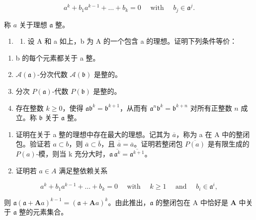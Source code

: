\[
a ^ {k} + b _ {1} a ^ {k - 1} + \dots + b _ {k} = 0 \quad \text { with } \quad b _ {j} \in \mathfrak {a} ^ {j}.
\]

称 \(a\) 关于理想 \(\mathfrak{a}\) 整。

\begin{enumerate}
\def\labelenumi{\arabic{enumi})}
\setcounter{enumi}{8}
\tightlist
\item
  \begin{enumerate}
  \def\labelenumii{\alph{enumii})}
  \tightlist
  \item
    设 A 和 a 如上，b 为 A 的一个包含 a 的理想。证明下列条件等价：
  \end{enumerate}
\end{enumerate}

\begin{enumerate}
\def\labelenumi{(\roman{enumi})}
\item
  b 的每个元素都关于 a 整。
\item
  \(\mathcal{A}(\mathfrak{a})\)-分次代数 \(\mathcal{A}(\mathfrak{b})\) 是整的。
\item
  分次 \(P(\mathfrak{a})\)-代数 \(P(\mathfrak{b})\) 是整的。
\item
  存在整数 \(k \geqslant 0\)，使得 \(\mathfrak{a}\mathfrak{b}^{k} = \mathfrak{b}^{k+1}\)，从而有 \(\mathfrak{a}^{n}\mathfrak{b}^{k} = \mathfrak{b}^{k+n}\) 对所有正整数 \(n\) 成立。称 \(\mathfrak{b}\) 关于 \(\mathfrak{a}\) 整。
\end{enumerate}

\begin{enumerate}
\def\labelenumi{\alph{enumi})}
\setcounter{enumi}{1}
\item
  证明在关于 a 整的理想中存在最大的理想。记其为 \(\overline{a}\)，称为 a 在 A 中的整闭包。验证若 \(a \subset b\)，则 \(\overline{a} \subset \overline{b}\)，且 \(\overline{\overline{a}} = \overline{a}\)。证明若整闭包 \(\overline{P(a)}\) 是有限生成的 \(P(a)\)-模，则当 k 充分大时，\(\mathfrak{a}\,\overline{\mathfrak{a}^{k}} = \overline{\mathfrak{a}^{k+1}}\)。
\item
  证明若 \(a \in A\) 满足整依赖关系
\end{enumerate}

\[
a ^ {k} + b _ {1} a ^ {k - 1} + \dots + b _ {k} = 0 \quad \text { with } \quad k \geqslant 1 \quad \text { and } \quad b _ {i} \in \mathfrak {a} ^ {i},
\]

 则 \(\mathfrak{a}(\mathfrak{a} + \mathbf{A}a)^{k-1} = (\mathfrak{a} + \mathbf{A}a)^k\)。由此推出，\(\mathfrak{a}\) 的整闭包在 A 中恰好是 \(\mathbf{A}\) 中关于 \(\mathfrak{a}\) 整的元素集合。

